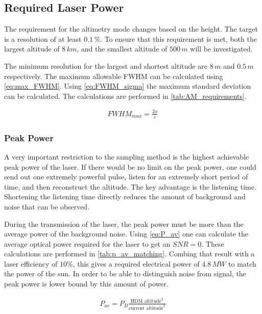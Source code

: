\subsection{Required Laser Power} 
\label{ssec:resolution}
The requirement for the altimetry mode changes based on the height. The target is a resolution of at least $0.1\,\%$. To ensure that this requirement is met, both the largest altitude of $8\,km$, and the smallest altitude of $500\,m$ will be investigated.

The minimum resolution for the largest and shortest altitude are $8\,m$ and $0.5\,m$ respectively. The maximum allowable FWHM can be calculated using \cref{eq:max_FWHM}.
 Using \cref{eq:FWHM_sigma} the maximum standard deviation can be calculated. The calculations are performed in \cref{tab:AM_requirements}.

\begin{align}\label{eq:max_FWHM}
FWHM_{max} = \frac{2x}{c}
\end{align}



\subsubsection{Peak Power}
A very important restriction to the sampling method is the highest achievable peak power of the laser. If there would be no limit on the peak power, one could send out one extremely powerful pulse, listen for an extremely short period of time, and then reconstruct the altitude. The key advantage is the listening time. Shortening the listening time directly reduces the amount of background and noise that can be observed. 

During the transmission of the laser, the peak power must be more than the average power of the background noise. Using \cref{eq:P_av} one can calculate the average optical power required for the laser to get an $SNR=0$. These calculations are performed in \cref{tab:p_av_matching}. Combing that result with a laser efficiency of $10\%$, this gives a required electrical power of $4.8\,MW$ to match the power of the sun. In order to be able to distinguish noise from signal, the peak power is lower bound by this amount of power.

\begin{align}\label{eq:P_av}
P_{av} = P_B\frac{\text{HDM altitude}^2}{\text{current altitude}^2}
\end{align} 



